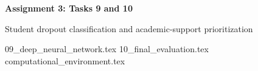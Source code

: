 \documentclass[a4paper,11pt]{article}
\begin{document}
\begin{center}
    {\Large\bfseries Assignment 3: Tasks 9 and 10}\par
    \small Student dropout classification and academic-support prioritization
\end{center}
\setcounter{section}{8}
{09_deep_neural_network.tex}
{10_final_evaluation.tex}
\printbibliography[heading=bibintoc,title={References}]
\clearpage
\appendix
{computational_environment.tex}
\end{document}
